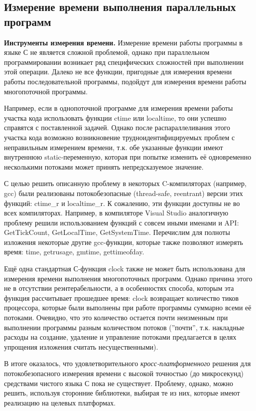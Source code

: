 \subsection{Измерение времени выполнения параллельных программ}

\textbf{Инструменты измерения времени.} Измерение времени работы программы в языке С не является сложной проблемой, однако при параллельном программировании возникает ряд специфических сложностей при выполнении этой операции. Далеко не все функции, пригодные для измерения времени работы последовательной программы, подойдут для измерения времени работы многопоточной программы. 

Например, если в однопоточной программе для измерения времени работы участка кода использовать функции ctime или localtime, то они успешно справятся с поставленной задачей. Однако после распараллеливания этого участка кода возможно возникновение трудноидентифицируемых проблем с неправильным измерением времени, т.к. обе указанные функции имеют внутреннюю static-переменную, которая при попытке изменить её одновременно несколькими потоками может принять непредсказуемое значение.

С целью решить описанную проблему в некоторых C-компиляторах (например, gcc) были реализованы потокобезопасные (thread-safe, reen\-trant) версии этих функций: ctime\_r и localtime\_r. К сожалению, эти функции доступны не во всех компиляторах. Например, в компиляторе Visual Studio аналогичную проблему решили использованием функций с совсем иными именами и API: Get\-Tick\-Count, Get\-Local\-Time, Get\-System\-Time. Перечислим для полноты изложения некоторые другие gcc-функции, которые также позволяют измерять время: time, get\-r\-usage, gm\-time, get\-time\-of\-day.

Ещё одна стандартная С-функция clock также не может быть использована для измерения времени выполнения многопоточных программ. Однако причина этого не в отсутствии реэнтерабельности, а в особенностях способа, которым эта функция рассчитывает прошедшее время: clock возвращает количество тиков процессора, которые были выполнены при работе программы суммарно всеми её потоками. Очевидно, что это количество остается почти неизменным при выполнении программы разным количеством потоков (''почти'', т.к. накладные расходы на создание, удаление и управление потоками предлагается в целях упрощения изложения считать несущественными).

В итоге оказалось, что удовлетворительного \textit{кросс-платформенного} решения для потокобезопасного измерения времени с высокой точностью (до микросекунд) средствами чистого языка С пока не существует. Проблему, однако, можно решить, используя сторонние библиотеки, выбирая те из них, которые имеют реализацию на целевых платформах. 


